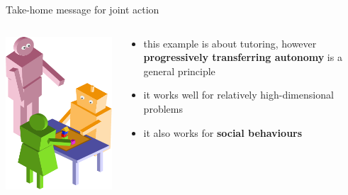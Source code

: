 \documentclass[compress]{beamer}
\begin{document}
\begin{frame}{Take-home message for joint action}

    \begin{columns}
        \begin{column}{0.45\linewidth}
            
            \begin{center}
                \includegraphics[width=0.9\linewidth]{sparc/sparc}
            \end{center}
        \end{column}
        \begin{column}{0.55\linewidth}
            \begin{itemize}
                \item this example is about tutoring, however {\bf progressively
                    transferring autonomy} is a general principle
                \item it works well for relatively high-dimensional problems
                \item it also works for {\bf social behaviours}
            \end{itemize}
        \end{column}
    \end{columns}


\end{frame}
\end{document}

